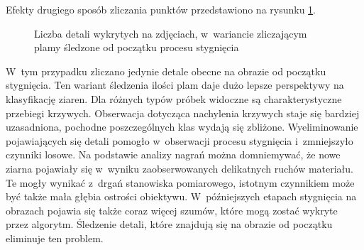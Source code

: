 Efekty drugiego sposób zliczania punktów przedstawiono na rysunku
\ref{fig:blob_chart_rem}.~%
\begin{figure}[tb]
    \centering
    
    \caption{Liczba detali wykrytych na zdjęciach, w~wariancie zliczającym
        plamy śledzone od początku procesu stygnięcia}
    \label{fig:blob_chart_rem}
\end{figure}
W~tym przypadku zliczano jedynie detale obecne na obrazie od początku
stygnięcia.
Ten wariant śledzenia ilości plam daje dużo lepsze perspektywy na klasyfikację
ziaren.
Dla różnych typów próbek widoczne są charakterystyczne przebiegi krzywych.
Obserwacja dotycząca nachylenia krzywych staje się bardziej uzasadniona,
pochodne poszczególnych klas wydają się zbliżone.
Wyeliminowanie pojawiających się detali pomogło w~obserwacji procesu stygnięcia
i~zmniejszyło czynniki losowe.
Na podstawie analizy nagrań można domniemywać, że nowe ziarna pojawiały się
w~wyniku zaobserwowanych delikatnych ruchów materiału.
Te mogły wynikać z~drgań stanowiska pomiarowego, istotnym czynnikiem może być
także mała głębia ostrości obiektywu.
W~późniejszych etapach stygnięcia na obrazach pojawia się także coraz więcej
szumów, które mogą zostać wykryte przez algorytm.
Śledzenie detali, które znajdują się na obrazie od początku eliminuje ten
problem.

